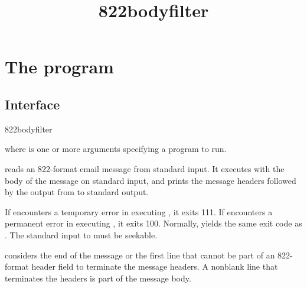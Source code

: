 \documentclass{book}
\title{822bodyfilter}
\begin{document}
\section{The  program}

\subsection{Interface}
\begin{code}%
  822bodyfilter 
\end{code}
where  is one or more arguments specifying a program to
run.

 reads an 822-format email message from standard
input.  It executes  with the body of the message on
standard input, and prints the message headers followed by the output
from  to standard output.

If  encounters a temporary error in executing
, it exits 111.  If  encounters a
permanent error in executing , it exits 100.  Normally,
 yields the same exit code as .  The
standard input to  must be seekable.

 considers the end of the message or the first line
that cannot be part of an 822-format header field to terminate the
message headers.  A nonblank line that terminates the headers is part
of the message body.
\end{document}
